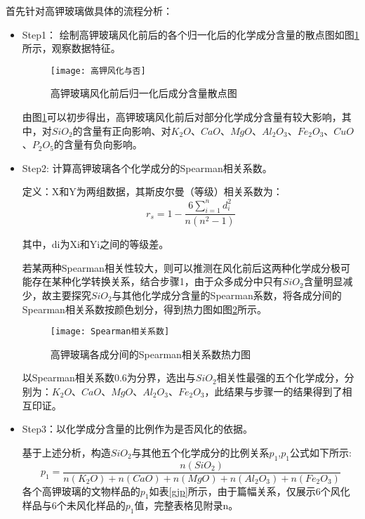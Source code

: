 \documentclass[withoutpreface,bwprint]{cumcmthesis} %
\begin{document}
首先针对高钾玻璃做具体的流程分析：
\begin{itemize}
	\item Step1： 绘制高钾玻璃风化前后的各个归一化后的化学成分含量的散点图如图\ref{gjfh}所示，观察数据特征。
	
	\begin{figure}[!h]
		\centering
		\texttt{[image: 高钾风化与否]}
		\caption{高钾玻璃风化前后归一化后成分含量散点图}
		\label{gjfh}
	\end{figure}
	
	由图\ref{gjfh}可以初步得出，高钾玻璃风化前后对部分化学成分含量有较大影响，其中，对$SiO_{2}$的含量有正向影响、对$K_{2}O$、$CaO$、$MgO$、$Al_{2}O_{3}$、$Fe_{2}O_{3}$、$CuO$、$P_{2}O_{5}$的含量有负向影响。
	
	\item Step2: 计算高钾玻璃各个化学成分的Spearman相关系数。
	
	 定义：X和Y为两组数据，其斯皮尔曼（等级）相关系数为：
	 \[
	 r_{s}=1-\frac{6 \sum_{i=1}^{n} d_{i}^{2}}{n\left(n^{2}-1\right)}
	 \]
	
	 其中，di为Xi和Yi之间的等级差。
	
	若某两种Spearman相关性较大，则可以推测在风化前后这两种化学成分极可能存在某种化学转换关系，结合步骤1，由于众多成分中只有$SiO_{2}$含量明显减少，故主要探究$SiO_{2}$与其他化学成分含量的Spearman系数，将各成分间的Spearman相关系数按颜色划分，得到热力图如图\ref{Spearman}所示。
	
	\begin{figure}[!h]
		\centering
		\texttt{[image: Spearman相关系数]}
		\caption{高钾玻璃各成分间的Spearman相关系数热力图}
		\label{Spearman}
	\end{figure}

	
以Spearman相关系数0.6为分界，选出与$SiO_{2}$相关性最强的五个化学成分，分别为：$K_{2}O$、$CaO$、$MgO$、$Al_{2}O_{3}$、$Fe_{2}O_{3}$，此结果与步骤一的结果得到了相互印证。
	
	
	\item Step3：以化学成分含量的比例作为是否风化的依据。
	
	 基于上述分析，构造$SiO_{2}$与其他五个化学成分的比例关系$p_{1}$,$p_{1}$公式如下所示: $$p_{1}=\frac{n(SiO_{2})}{n(K_{2}O)+n(CaO)+n(MgO)+n(Al_{2}O_{3})+n(Fe_{2}O_{3})}$$ 各个高钾玻璃的文物样品的$p_{1}$如表\ref{gjp}所示，由于篇幅关系，仅展示6个风化样品与6个未风化样品的$p_{1}$值，完整表格见附录n。
	

\end{itemize}
\end{document}
